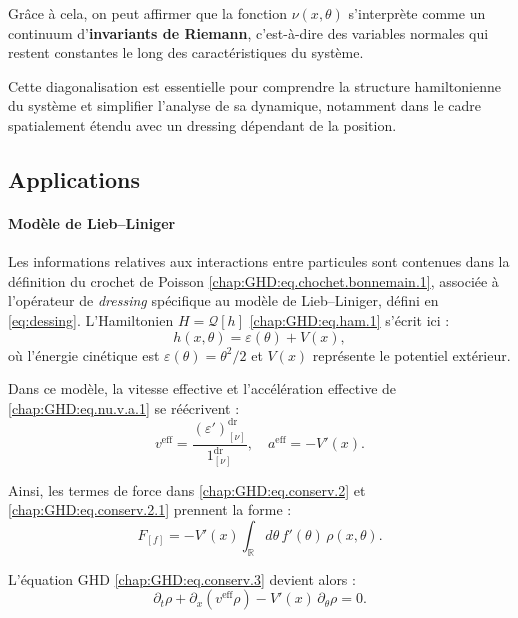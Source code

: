 \medskip

Grâce à cela, on peut affirmer que la fonction $\nu (x , \theta)$  s’interprète comme un continuum d’{\bf invariants de Riemann}, c’est-à-dire des variables normales qui restent constantes le long des caractéristiques du système.

\medskip

Cette diagonalisation est essentielle pour comprendre la structure hamiltonienne du système et simplifier l'analyse de sa dynamique, notamment dans le cadre spatialement étendu avec un dressing dépendant de la position. 


\subsection{Applications}

\paragraph{Modèle de Lieb–Liniger}

Les informations relatives aux interactions entre particules sont contenues dans la définition du crochet de Poisson \eqref{chap:GHD:eq.chochet.bonnemain.1}, associée à l’opérateur de \emph{dressing} spécifique au modèle de Lieb–Liniger, défini en \eqref{eq:dessing}.  
L’Hamiltonien $H = \mathcal{Q}[h]$ \eqref{chap:GHD:eq.ham.1} s’écrit ici :
\begin{equation}\label{chap:GHD:eq.ham.2}
	h(x , \theta ) = \varepsilon(\theta) + V(x),
\end{equation}
où l’énergie cinétique est $\varepsilon(\theta) = \theta^2 / 2$ et $V(x)$ représente le potentiel extérieur.

\medskip

Dans ce modèle, la vitesse effective et l’accélération effective de \eqref{chap:GHD:eq.nu.v.a.1} se réécrivent :
\begin{equation}
	v^{\mathrm{eff}} = \frac{(\varepsilon')^{\mathrm{dr}}_{[\nu]}}{1^{\mathrm{dr}}_{[\nu]}}, 
	\quad a^{\mathrm{eff}} = - V'(x).
\end{equation}

Ainsi, les termes de force dans \eqref{chap:GHD:eq.conserv.2} et \eqref{chap:GHD:eq.conserv.2.1} prennent la forme :
\begin{equation}
	F_{[f]} = -V'(x) \int_{\mathbb{R}} d\theta \, f'(\theta) \, \rho(x, \theta).
\end{equation}

L’équation GHD \eqref{chap:GHD:eq.conserv.3} devient alors :
\begin{equation}\label{chap:GHD:eq.conserv.3.1}
	\partial_t \rho + \partial_x\!\left(v^{\mathrm{eff}} \rho\right) - V'(x) \, \partial_\theta \rho = 0.
\end{equation}

